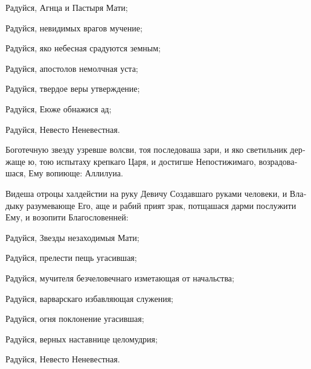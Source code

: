 \begin{russian}


  \KhorRaduisya Радуйся, Агнца и Пастыря Мати;


  Радуйся, невидимых врагов мучение;


  Радуйся, яко небесная срадуются земным;


  Радуйся, апостолов немолчная уста;


  Радуйся, твердое веры утверждение;


  Радуйся, Еюже обнажися ад;


  Радуйся, Невесто Неневестная.


  \Ierei Боготечную звезду узревше волсви, тоя последоваша зари, и яко светильник держаще ю, тою испытаху крепкаго Царя, и достигше Непостижимаго, возрадовашася, Ему вопиюще: Аллилуиа.


  \Ierei Видеша отроцы халдейстии на руку Девичу Создавшаго руками человеки, и Владыку разумевающе Его, аще и рабий прият зрак, потщашася дарми послужити Ему, и возопити Благословенней:

  \KhorRaduisya Радуйся, Звезды незаходимыя Мати;


  Радуйся, прелести пещь угасившая;


  Радуйся, мучителя безчеловечнаго изметающая от начальства;


  Радуйся, варварскаго избавляющая служения;


  Радуйся, огня поклонение угасившая;


  Радуйся, верных наставнице целомудрия;


  Радуйся, Невесто Неневестная.

\end{russian}

